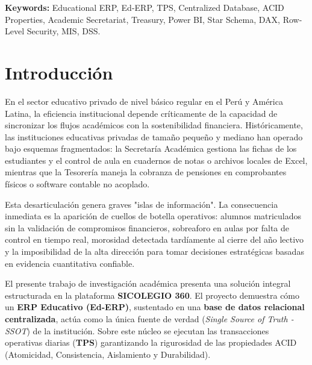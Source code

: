 \documentclass[12pt,a4paper,oneside]{report}
\begin{document}
\textbf{Keywords:} Educational ERP, Ed-ERP, TPS, Centralized Database, ACID Properties, Academic Secretariat, Treasury, Power BI, Star Schema, DAX, Row-Level Security, MIS, DSS.

\tableofcontents
\listoftables
\listoffigures
\clearpage
{}
\setcounter{page}{1}

\chapter*{Introducción}

En el sector educativo privado de nivel básico regular en el Perú y América Latina, la eficiencia institucional depende críticamente de la capacidad de sincronizar los flujos académicos con la sostenibilidad financiera. Históricamente, las instituciones educativas privadas de tamaño pequeño y mediano han operado bajo esquemas fragmentados: la Secretaría Académica gestiona las fichas de los estudiantes y el control de aula en cuadernos de notas o archivos locales de Excel, mientras que la Tesorería maneja la cobranza de pensiones en comprobantes físicos o software contable no acoplado.

Esta desarticulación genera graves "islas de información". La consecuencia inmediata es la aparición de cuellos de botella operativos: alumnos matriculados sin la validación de compromisos financieros, sobreaforo en aulas por falta de control en tiempo real, morosidad detectada tardíamente al cierre del año lectivo y la imposibilidad de la alta dirección para tomar decisiones estratégicas basadas en evidencia cuantitativa confiable.

El presente trabajo de investigación académica presenta una solución integral estructurada en la plataforma \textbf{SICOLEGIO 360}. El proyecto demuestra cómo un \textbf{ERP Educativo (Ed-ERP)}, sustentado en una \textbf{base de datos relacional centralizada}, actúa como la única fuente de verdad (\textit{Single Source of Truth - SSOT}) de la institución. Sobre este núcleo se ejecutan las transacciones operativas diarias (\textbf{TPS}) garantizando la rigurosidad de las propiedades ACID (Atomicidad, Consistencia, Aislamiento y Durabilidad).
\end{document}
